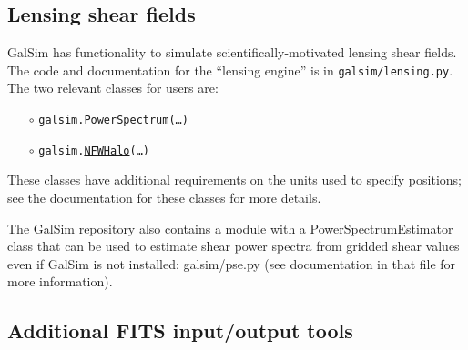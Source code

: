 \documentclass[preprint,11pt]{../../devel/modules/aastex}
\begin{document}
\subsection{Lensing shear fields}\label{sect:lensing}

GalSim has functionality to simulate scientifically-motivated lensing
shear fields. The code and documentation for the
``lensing engine'' is in {\tt galsim/lensing.py}.  The two relevant
classes for users are:

\begin{itemize}
\item[$\circ$]
  \texttt{galsim.}\href{http://galsim-developers.github.com/GalSim/classgalsim_1_1lensing_1_1_power_spectrum.html}{\texttt{PowerSpectrum}}\texttt{(\dots)}

\item[$\circ$]
  \texttt{galsim.}\href{http://galsim-developers.github.com/GalSim/classgalsim_1_1lensing_1_1_n_f_w_halo.html}{\texttt{NFWHalo}}\texttt{(\dots)}
\end{itemize}

These classes have additional requirements on the units used to specify
positions; see the documentation for these classes for more details.

The GalSim repository also contains a module with a
PowerSpectrumEstimator class that can be used to estimate shear power
spectra from gridded shear values even if GalSim is not installed:
galsim/pse.py (see documentation in that file for more information).

\subsection{Additional FITS input/output tools}\label{sect:multifits}
\end{document}
